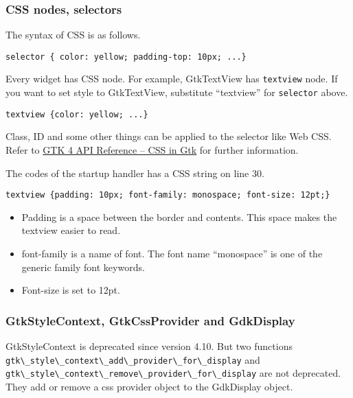 \subsubsection{CSS nodes, selectors}\label{css-nodes-selectors}

The syntax of CSS is as follows.

\begin{lstlisting}
selector { color: yellow; padding-top: 10px; ...}
\end{lstlisting}

Every widget has CSS node. For example, GtkTextView has
\passthrough{\lstinline!textview!} node. If you want to set style to
GtkTextView, substitute ``textview'' for
\passthrough{\lstinline!selector!} above.

\begin{lstlisting}
textview {color: yellow; ...}
\end{lstlisting}

Class, ID and some other things can be applied to the selector like Web
CSS. Refer to \href{https://docs.gtk.org/gtk4/css-overview.html}{GTK 4
API Reference -- CSS in Gtk} for further information.

The codes of the startup handler has a CSS string on line 30.

\begin{lstlisting}
textview {padding: 10px; font-family: monospace; font-size: 12pt;}
\end{lstlisting}

\begin{itemize}
\tightlist
\item
  Padding is a space between the border and contents. This space makes
  the textview easier to read.
\item
  font-family is a name of font. The font name ``monospace'' is one of
  the generic family font keywords.
\item
  Font-size is set to 12pt.
\end{itemize}

\subsubsection{GtkStyleContext, GtkCssProvider and
GdkDisplay}\label{gtkstylecontext-gtkcssprovider-and-gdkdisplay}

GtkStyleContext is deprecated since version 4.10. But two functions
\passthrough{\lstinline!gtk\_style\_context\_add\_provider\_for\_display!}
and
\passthrough{\lstinline!gtk\_style\_context\_remove\_provider\_for\_display!}
are not deprecated. They add or remove a css provider object to the
GdkDisplay object.

